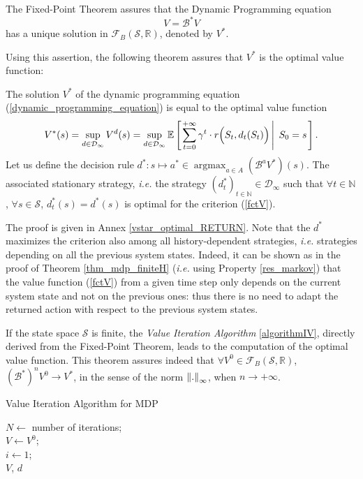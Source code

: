 The Fixed-Point Theorem assures that the Dynamic Programming equation
\begin{equation} 
\label{dynamic_programming_equation} V = \mathcal{B}^*V
\end{equation}
has a unique solution in $\mathcal{F}_{B}(\mathcal{S},\mathbb{R})$,
denoted by $V^*$.

Using this assertion, the following theorem assures that $V^*$ is the optimal value function:
\begin{theorem}
The solution $V^*$ of the dynamic programming equation (\ref{dynamic_programming_equation})
is equal to the optimal value function
\label{vstar_optimal}
\[ V^*(s) = \sup_{d \in \mathcal{D}_{\infty}} V^d(s) =\sup_{d \in \mathcal{D}_{\infty}} \mathbb{E} \left[ \left. \sum_{t=0}^{+ \infty} \gamma^t \cdot r\Big(S_t,d_t(S_t)\Big) \, \right| \left. \, S_0=s  \right. \right]. \]
Let us define the decision rule $d^*:  s \mapsto a^* \in \operatorname*{argmax}_{a \in A}(\mathcal{B}^a V^*)(s)$.
The associated stationary strategy, \textit{i.e.} 
the strategy $(d^*_t)_{t \in \mathbb{N}} \in \mathcal{D}_{\infty}$
such that $\forall t \in \mathbb{N}$,
$\forall s \in \mathcal{S}$,
$d_t^*(s)=d^*(s)$ is optimal for the criterion (\ref{fctV}).
\end{theorem}
The proof is given in Annex \ref{vstar_optimal_RETURN}.
Note that the $d^*$ maximizes the criterion
also among all history-dependent strategies,
\textit{i.e.} strategies depending 
on all the previous system states.
Indeed, it can be shown 
as in the proof of Theorem \ref{thm_mdp_finiteH}
(\textit{i.e.} using Property \ref{res_markov})
that the value function (\ref{fctV}) 
from a given time step
only depends on the current system state 
and not on the previous ones:
thus there is no need to
adapt the returned action
with respect to the previous system states.

If the state space $\mathcal{S}$ is finite, 
the \textit{Value Iteration Algorithm} \ref{algorithmIV},
directly derived from the Fixed-Point Theorem, 
leads to the computation of the optimal value function. 
This theorem assures indeed that 
$\forall V^0 \in \mathcal{F}_{B}(\mathcal{S},\mathbb{R})$, 
$(\mathcal{B}^*)^n V^0 \longrightarrow V^*$,
in the sense of the norm $\left\lVert . \right\rVert_{\infty}$,
when $n \rightarrow + \infty$.

\begin{algorithm} \caption{Value Iteration Algorithm for MDP} \label{algorithmIV}
$N \gets$ number of iterations;\\ 
$V \gets V^0$; \\
$i \gets 1$; \\
\Return $V$, $d$
\end{algorithm}

